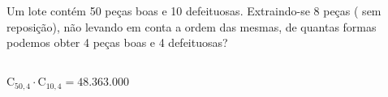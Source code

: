 \begin{ex}
  Um lote contém 50 peças boas e 10 defeituosas. Extraindo-se 8 peças ( sem reposição), não levando em conta a ordem das mesmas, de quantas formas podemos obter 4 peças boas e 4 defeituosas?

  \begin{sol}
   \phantom{A}  \\
   $\mathrm{C}_{{50},4}\cdot\mathrm{C}_{{10},4}=48.363.000$
  \end{sol}
  \end{ex}